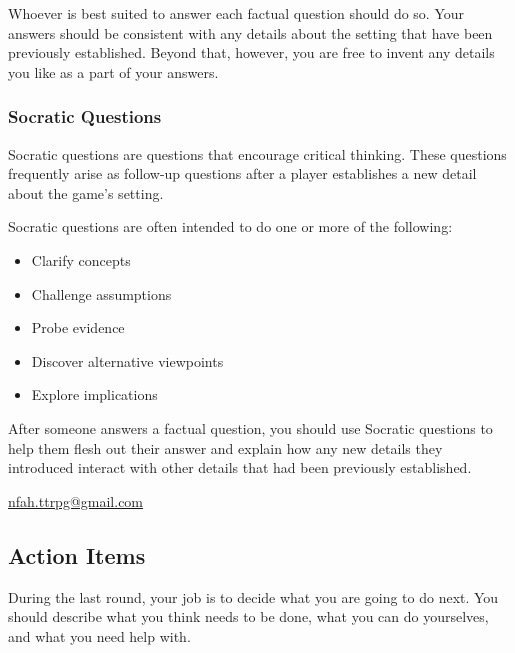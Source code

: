 \documentclass[a6paper, 11pt, parskip=half, DIV=15]{scrartcl}
\begin{document}
\vfill

Whoever is best suited to answer each factual question should do so.
Your answers should be consistent with any details about the setting that have been previously established.
Beyond that, however, you are free to invent any details you like as a part of your answers.

\newpage
\enlargethispage{1.75\baselineskip}

\subsubsection*{Socratic Questions}
Socratic questions are questions that encourage critical thinking.
These questions frequently arise as follow-up questions after a player establishes a new detail about the game's setting.

Socratic questions are often intended to do one or more of the following:
\begin{itemize}[nosep]
	\item Clarify concepts
	\item Challenge assumptions
	\item Probe evidence
	\item Discover alternative viewpoints
	\item Explore implications
\end{itemize}

After someone answers a factual question, you should use Socratic questions to help them flesh out their answer and explain how any new details they introduced interact with other details that had been previously established.

\vfill

\hrulefill
\begin{description}[nosep]
\item[\textbf{Contact}:] \href{mailto:nfah.ttrpg@gmail.com}{nfah.ttrpg@gmail.com}\\
\item[\textbf{License}:] \doclicenseText%
\end{description}

\newpage
\enlargethispage{1.75\baselineskip}

\subsection*{Action Items}
During the last round, your job is to decide what you are going to do next.
You should describe what you think needs to be done, what you can do yourselves, and what you need help with.
\end{document}

